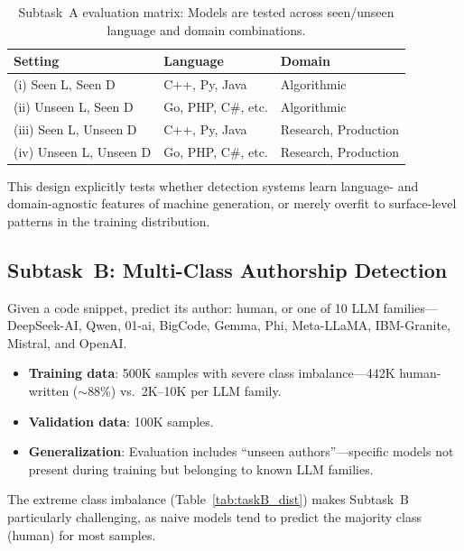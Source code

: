 \documentclass[11pt]{article}
\begin{document}
\begin{table}[ht]
\centering
\small
\begin{tabularx}{\columnwidth}{@{}l l X@{}}
\toprule
\textbf{Setting} & \textbf{Language} & \textbf{Domain} \\ \midrule
(i) Seen L, Seen D & C++, Py, Java & Algorithmic \\
(ii) Unseen L, Seen D & Go, PHP, C\#, etc. & Algorithmic \\
(iii) Seen L, Unseen D & C++, Py, Java & Research, Production \\
(iv) Unseen L, Unseen D & Go, PHP, C\#, etc. & Research, Production \\ \bottomrule
\end{tabularx}
\caption{Subtask~A evaluation matrix: Models are tested across seen/unseen language and domain combinations.}
\label{tab:taskA_eval}
\end{table}

This design explicitly tests whether detection systems learn language- and domain-agnostic features of machine generation, or merely overfit to surface-level patterns in the training distribution.

\subsection{Subtask~B: Multi-Class Authorship Detection}

Given a code snippet, predict its author: human, or one of 10 LLM families---DeepSeek-AI, Qwen, 01-ai, BigCode, Gemma, Phi, Meta-LLaMA, IBM-Granite, Mistral, and OpenAI.

\begin{itemize}
    \item \textbf{Training data}: 500K samples with severe class imbalance---442K human-written ($\sim$88\%) vs.\ 2K--10K per LLM family.
    \item \textbf{Validation data}: 100K samples.
    \item \textbf{Generalization}: Evaluation includes ``unseen authors''---specific models not present during training but belonging to known LLM families.
\end{itemize}

The extreme class imbalance (Table~\ref{tab:taskB_dist}) makes Subtask~B particularly challenging, as naive models tend to predict the majority class (human) for most samples.
\end{document}
